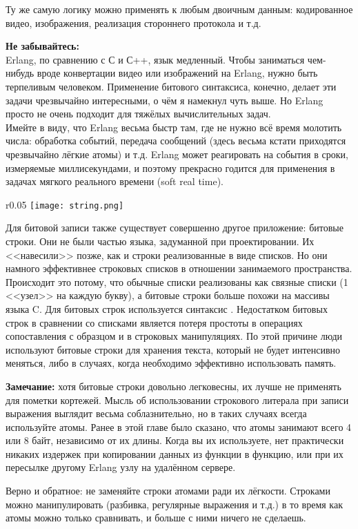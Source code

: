Ту же самую логику можно применять к любым двоичным данным: кодированное видео, изображения, реализация стороннего протокола и т.д.\\ 
\colorbox{lorange}
{
    \begin{minipage}{\linewidth}
        \textbf{Не забывайтесь:}\\ 
        Erlang, по сравнению с С и С++, язык медленный.
        Чтобы заниматься чем\--нибудь вроде конвертации видео или изображений на Erlang, нужно быть терпеливым человеком.
        Применение битового синтаксиса, конечно, делает эти задачи чрезвычайно интересными, о чём я намекнул чуть выше.
        Но Erlang просто не очень подходит для тяжёлых вычислительных задач.\\ 
        Имейте в виду, что Erlang весьма быстр там, где не нужно всё время молотить числа: обработка событий, передача сообщений (здесь весьма кстати приходятся чрезвычайно лёгкие атомы) и т.д.
        Erlang может реагировать на события в сроки, измеряемые миллисекундами, и поэтому прекрасно годится для применения в задачах мягкого реального времени (soft real time).\\ 
    \end{minipage}
}

\begin{wrapfigure}{r}{0.05\textwidth}
    \texttt{[image: string.png]}
\end{wrapfigure}

Для битовой записи также существует совершенно другое приложение: битовые строки.
Они не были частью языка, задуманной при проектировании.
Их <<навесили>> позже, как и строки реализованные в виде списков.
Но они намного эффективнее строковых списков в отношении занимаемого пространства.
Происходит это потому, что обычные списки реализованы как связные списки (1 <<узел>> на каждую букву), а битовые строки больше похожи на массивы языка C.
Для битовых строк используется синтаксис .
Недостатком битовых строк в сравнении со списками является потеря простоты в операциях сопоставления с образцом и в строковых манипуляциях.
По этой причине люди используют битовые строки для хранения текста, который не будет интенсивно меняться, либо в случаях, когда необходимо эффективно использовать память.\\ 
\colorbox{lgray}{
    \begin{minipage}{\linewidth}
        \textbf{Замечание:} хотя битовые строки довольно легковесны, их лучше не применять для пометки кортежей.
        Мысль об использовании строкового литерала при записи выражения  выглядит весьма соблазнительно, но в таких случаях всегда используйте атомы.
        Ранее в этой главе было сказано, что атомы занимают всего 4 или 8 байт, независимо от их длины.
        Когда вы их используете, нет практически никаких издержек при копировании данных из функции в функцию, или при их пересылке другому Erlang узлу на удалённом сервере.
        
        Верно и обратное: не заменяйте строки атомами ради их лёгкости.
        Строками можно манипулировать (разбивка, регулярные выражения и т.д.) в то время как атомы можно только сравнивать, и больше с ними ничего не сделаешь.
    \end{minipage}
}
